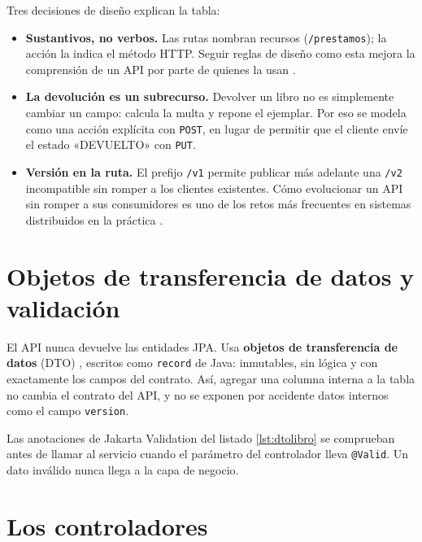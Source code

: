 Tres decisiones de diseño explican la tabla:

\begin{itemize}
	\item \textbf{Sustantivos, no verbos.} Las rutas nombran recursos (\texttt{/prestamos}); la acción la indica el método HTTP. Seguir reglas de diseño como esta mejora la comprensión de un API por parte de quienes la usan \cite{bogner2023restful}.
	\item \textbf{La devolución es un subrecurso.} Devolver un libro no es simplemente cambiar un campo: calcula la multa y repone el ejemplar. Por eso se modela como una acción explícita con \texttt{POST}, en lugar de permitir que el cliente envíe el estado «DEVUELTO» con \texttt{PUT}.
	\item \textbf{Versión en la ruta.} El prefijo \texttt{/v1} permite publicar más adelante una \texttt{/v2} incompatible sin romper a los clientes existentes. Cómo evolucionar un API sin romper a sus consumidores es uno de los retos más frecuentes en sistemas distribuidos en la práctica \cite{lercher2024microservice}.
\end{itemize}

\section{Objetos de transferencia de datos y validación}

El API nunca devuelve las entidades JPA. Usa \textbf{objetos de transferencia de datos} (DTO) \cite{fowler2002patterns}, escritos como \texttt{record} de Java: inmutables, sin lógica y con exactamente los campos del contrato. Así, agregar una columna interna a la tabla no cambia el contrato del API, y no se exponen por accidente datos internos como el campo \texttt{version}.



Las anotaciones de Jakarta Validation del listado \ref{lst:dtolibro} se comprueban antes de llamar al servicio cuando el parámetro del controlador lleva \texttt{@Valid}. Un dato inválido nunca llega a la capa de negocio.

\section{Los controladores}



